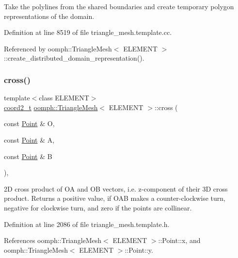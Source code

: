 Take the polylines from the shared boundaries and create temporary polygon representations of the domain. 



Definition at line 8519 of file triangle\+\_\+mesh.\+template.\+cc.



Referenced by oomph\+::\+Triangle\+Mesh$<$ E\+L\+E\+M\+E\+N\+T $>$\+::create\+\_\+distributed\+\_\+domain\+\_\+representation().

\mbox{\label{classoomph_1_1TriangleMesh_a83f8fd5592a7ba062eec9390b7b84426}} 
\subsubsection{\texorpdfstring{cross()}{cross()}}
{\footnotesize\ttfamily template$<$class E\+L\+E\+M\+E\+NT$>$ \\
\hyperlink{classoomph_1_1TriangleMesh_afd4948d805e89116cc5da629e413a449}{coord2\+\_\+t} \hyperlink{classoomph_1_1TriangleMesh}{oomph\+::\+Triangle\+Mesh}$<$ E\+L\+E\+M\+E\+NT $>$\+::cross (\begin{DoxyParamCaption}\item[{const \hyperlink{structoomph_1_1TriangleMesh_1_1Point}{Point} \&}]{O,  }\item[{const \hyperlink{structoomph_1_1TriangleMesh_1_1Point}{Point} \&}]{A,  }\item[{const \hyperlink{structoomph_1_1TriangleMesh_1_1Point}{Point} \&}]{B }\end{DoxyParamCaption})\hspace{0.3cm}{\ttfamily [inline]}, {\ttfamily [private]}}



2D cross product of OA and OB vectors, i.\+e. z-\/component of their 3D cross product. Returns a positive value, if O\+AB makes a counter-\/clockwise turn, negative for clockwise turn, and zero if the points are collinear. 



Definition at line 2086 of file triangle\+\_\+mesh.\+template.\+h.



References oomph\+::\+Triangle\+Mesh$<$ E\+L\+E\+M\+E\+N\+T $>$\+::\+Point\+::x, and oomph\+::\+Triangle\+Mesh$<$ E\+L\+E\+M\+E\+N\+T $>$\+::\+Point\+::y.

